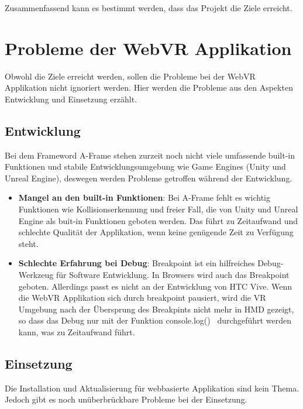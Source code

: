Zusammenfassend kann es bestimmt werden, dass das Projekt die Ziele erreicht.

\section{Probleme der WebVR Applikation}
Obwohl die Ziele erreicht werden, sollen die Probleme bei der WebVR Applikation nicht ignoriert werden. Hier werden die Probleme aus den Aspekten Entwicklung und Einsetzung erzählt.

\subsection{Entwicklung}

Bei dem Frameword A-Frame stehen zurzeit noch nicht viele umfassende built-in Funktionen und stabile Entwicklungsumgebung wie Game Engines (Unity und Unreal Engine), deswegen werden Probleme getroffen während der Entwicklung. 

\begin{itemize}
    \item \textbf{Mangel an den built-in Funktionen}: Bei A-Frame fehlt es wichtig Funktionen wie Kollisionserkennung und freier Fall, die von Unity und Unreal Engine als buit-in Funktionen geboten werden. Das führt zu Zeitaufwand und schlechte Qualität der Applikation, wenn keine genügende Zeit zu Verfügung steht.
    
    \item \textbf{Schlechte Erfahrung bei Debug}: Breakpoint ist ein hilfreiches Debug-Werkzeug für Software Entwicklung. In Browsers wird auch das Breakpoint geboten. Allerdings passt es nicht an der Entwicklung von HTC Vive. Wenn die WebVR Applikation sich durch breakpoint pausiert, wird die VR Umgebung nach der Übersprung des Breakpints nicht mehr in HMD gezeigt, so dass das Debug nur mit der Funktion \glqq console.log() \grqq\ durchgeführt werden kann, was zu Zeitaufwand führt.
    
\end{itemize}

\subsection{Einsetzung}

Die Installation und Aktualisierung für webbasierte Applikation sind kein Thema. Jedoch gibt es noch unüberbrückbare Probleme bei der Einsetzung.

